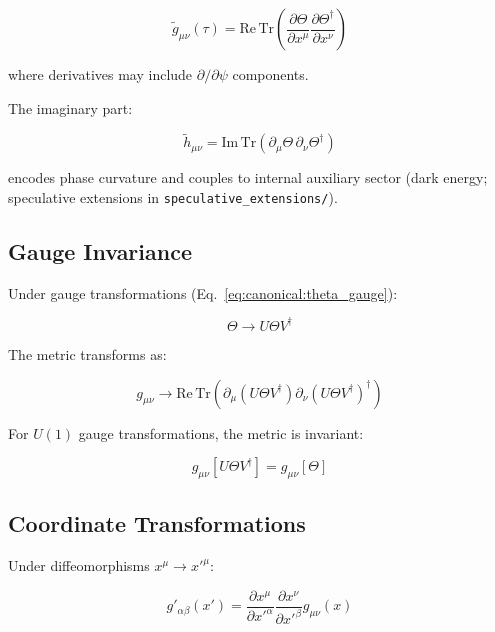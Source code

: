 \begin{equation}
\label{eq:canonical:complex_metric}
\tilde{g}_{\mu\nu}(\tau) = \text{Re}\,\text{Tr}\left(\frac{\partial\Theta}{\partial x^\mu} \frac{\partial\Theta^\dagger}{\partial x^\nu}\right)
\end{equation}

where derivatives may include $\partial/\partial\psi$ components.

The imaginary part:

\begin{equation}
\label{eq:canonical:metric_imaginary}
\tilde{h}_{\mu\nu} = \text{Im}\,\text{Tr}\left(\partial_\mu\Theta \, \partial_\nu\Theta^\dagger\right)
\end{equation}

encodes phase curvature and couples to internal auxiliary sector (dark energy; speculative extensions in \texttt{speculative\_extensions/}).

\subsection{Gauge Invariance}

Under gauge transformations (Eq.~\ref{eq:canonical:theta_gauge}):

\begin{equation}
\Theta \to U\Theta V^\dagger
\end{equation}

The metric transforms as:

\begin{equation}
\label{eq:canonical:metric_gauge}
g_{\mu\nu} \to \text{Re}\,\text{Tr}\left(\partial_\mu(U\Theta V^\dagger) \partial_\nu(U\Theta V^\dagger)^\dagger\right)
\end{equation}

For $U(1)$ gauge transformations, the metric is invariant:

\begin{equation}
g_{\mu\nu}[U\Theta V^\dagger] = g_{\mu\nu}[\Theta]
\end{equation}

\subsection{Coordinate Transformations}

Under diffeomorphisms $x^\mu \to x'^\mu$:

\begin{equation}
\label{eq:canonical:metric_diffeomorphism}
g'_{\alpha\beta}(x') = \frac{\partial x^\mu}{\partial x'^\alpha} \frac{\partial x^\nu}{\partial x'^\beta} g_{\mu\nu}(x)
\end{equation}

